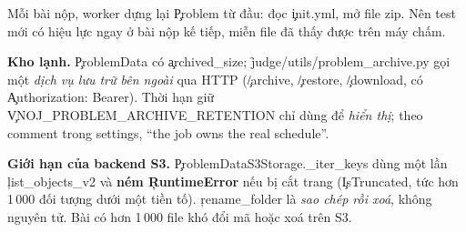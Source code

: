 Mỗi bài nộp, worker dựng lại \c{Problem} từ đầu: đọc \c{init.yml}, mở file zip. Nên test mới có hiệu lực ngay ở bài nộp kế tiếp, miễn file đã thấy được trên máy chấm. \tS


\textbf{Kho lạnh.} \c{ProblemData} có \c{archived_size}; \f{judge/utils/problem_archive.py} gọi một \emph{dịch vụ lưu trữ bên ngoài} qua HTTP (\c{/archive}, \c{/restore}, \c{/download}, có \c{Authorization: Bearer}). Thời hạn giữ \c{VNOJ_PROBLEM_ARCHIVE_RETENTION} chỉ dùng để \emph{hiển thị}; theo comment trong settings, ``the job owns the real schedule''. \tS

\textbf{Giới hạn của backend S3.} \c{ProblemDataS3Storage._iter_keys} dùng một lần \c{list_objects_v2} và \textbf{ném \c{RuntimeError}} nếu bị cắt trang (\c{IsTruncated}, tức hơn 1\,000 đối tượng dưới một tiền tố). \c{rename_folder} là \emph{sao chép rồi xoá}, không nguyên tử. Bài có hơn 1\,000 file khó đổi mã hoặc xoá trên S3. \tS \tI

